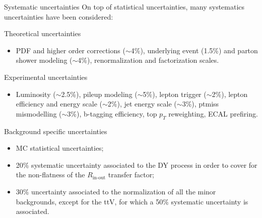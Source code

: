 \documentclass[8pt]{beamer}
\begin{document}
\begin{frame}{Systematic uncertainties}
\justifying
On top of statistical uncertainties, \alert{many systematics uncertainties} have been considered: \vfill

\begin{block}{\centering Theoretical uncertainties}\end{block} 

\begin{itemize}
\justifying
\item PDF and higher order corrections ($\sim$4\%), underlying event (1.5\%) and parton shower modeling ($\sim$4\%), renormalization and factorization scales.
\end{itemize} \vfill

\begin{block}{\centering Experimental uncertainties}\end{block}

\begin{itemize}
\justifying
\item Luminosity ($\sim$2.5\%), pileup modeling ($\sim$5\%), lepton trigger ($\sim$2\%), lepton efficiency and energy scale ($\sim$2\%), jet energy scale ($\sim$3\%), ptmiss mismodelling ($\sim$3\%), b-tagging efficiency, top $p_T$ reweighting, ECAL prefiring.
\end{itemize} \vfill

\begin{block}{\centering Background specific uncertainties}\end{block}

\begin{itemize}
\justifying
\item MC statistical uncertainties;
\item 20\% systematic uncertainty associated to the DY process in order to cover for the non-flatness of the $R_{\text{in-out}}$ transfer factor;
\item 30\% uncertainty associated to the normalization of all the minor backgrounds, except for the ttV, for which a 50\% systematic uncertainty is associated.
\end{itemize} \vfill
\end{frame}
\end{document}
